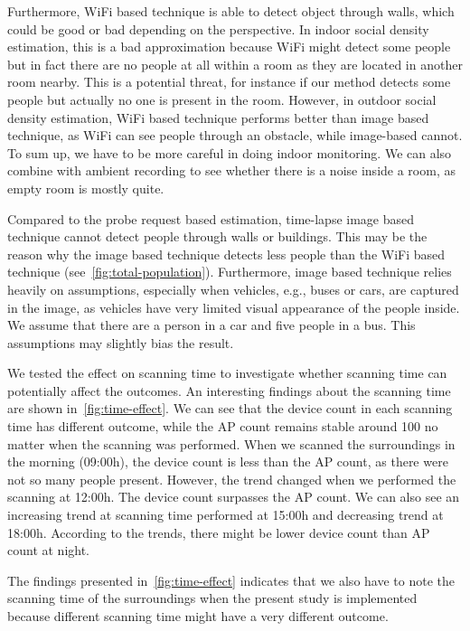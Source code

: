 	Furthermore, WiFi based technique is able to detect object through walls, which could be good or bad depending on the perspective. In indoor social density estimation, this is a bad approximation because WiFi might detect some people but in fact there are no people at all within a room as they are located in another room nearby. This is a potential threat, for instance if  our method detects some people but actually no one is present in the room. However, in outdoor social density estimation, WiFi based technique performs better than image based technique, as WiFi can see people through an obstacle, while image-based cannot. To sum up, we have to be more careful in doing indoor monitoring. We can also combine with ambient recording to see whether there is a noise inside a room, as empty room is mostly quite. 
	
	Compared to the probe request based estimation, time-lapse image based technique cannot detect people through walls or buildings. This may be the reason why the image based technique detects less people than the WiFi based technique (see~\autoref{fig:total-population}). Furthermore, image based technique relies heavily on assumptions, especially when vehicles, e.g., buses or cars, are captured in the image, as vehicles have very limited visual appearance of the people inside. We assume that there are a person in a car and five people in a bus. This assumptions may slightly bias the result.

	We tested the effect on scanning time to investigate whether scanning time can potentially affect the outcomes. An interesting findings about the scanning time are shown in~\autoref{fig:time-effect}. We can see that the device count in each scanning time has different outcome, while the \ac{AP} count remains stable around 100 no matter when the scanning was performed. When we scanned the surroundings in the morning (09:00h), the device count is less than the \ac{AP} count, as there were not so many people present. However, the trend changed when we performed the scanning at 12:00h. The device count surpasses the \ac{AP} count. We can also see an increasing trend at scanning time performed at 15:00h and decreasing trend at 18:00h.
	According to the trends, there might be lower device count than \ac{AP} count at night.

	The findings presented in~\autoref{fig:time-effect} indicates that we also have to note the scanning time of the surroundings when the present study is implemented because different scanning time might have a very different outcome.



